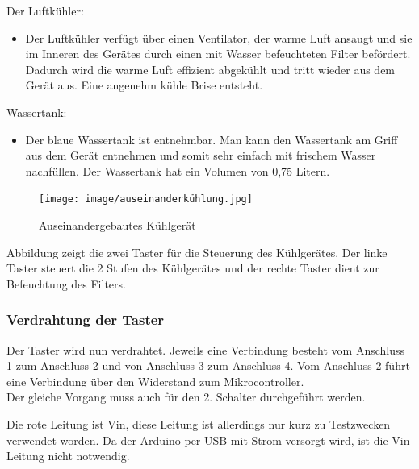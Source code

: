\vspace{3mm}
Der Luftkühler:
\begin{itemize}
    \item Der Luftkühler verfügt über einen Ventilator, der warme Luft ansaugt und sie im Inneren des Gerätes durch einen mit Wasser befeuchteten Filter befördert. Dadurch wird die warme Luft effizient abgekühlt und tritt wieder aus dem Gerät aus. Eine angenehm kühle Brise entsteht.
\end{itemize}
\pagebreak
Wassertank:
\begin{itemize}
    \item Der blaue Wassertank ist entnehmbar. Man kann den Wassertank am Griff aus dem Gerät entnehmen und somit sehr einfach mit frischem Wasser nachfüllen. Der Wassertank hat ein Volumen von 0,75 Litern.
\end{itemize}
\vspace{3mm}
\begin{figure}[H]
    \centering
    \texttt{[image: image/auseinanderkühlung.jpg]}
    \caption{Auseinandergebautes Kühlgerät}
    \label{fig:enter-label}
\end{figure}
\vspace{3mm}
Abbildung zeigt die zwei Taster für die Steuerung des Kühlgerätes. Der linke Taster steuert die 2 Stufen des Kühlgerätes und der rechte Taster dient zur Befeuchtung des Filters.\\

\newpage
\subsubsection{Verdrahtung der Taster}
\begin{figwindow}
Der Taster wird nun verdrahtet. Jeweils eine Verbindung besteht vom Anschluss 1 zum Anschluss 2 und von Anschluss 3 zum Anschluss 4. Vom Anschluss 2 führt eine Verbindung über den Widerstand zum Mikrocontroller.\\

Der gleiche Vorgang muss auch für den 2. Schalter durchgeführt werden.

\end{figwindow}
\vspace{40mm}
Die rote Leitung ist Vin, diese Leitung ist allerdings nur kurz zu Testzwecken verwendet worden. Da der Arduino per USB mit Strom versorgt wird, ist die Vin Leitung nicht notwendig.

